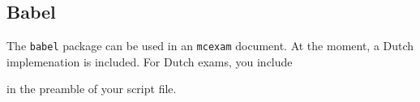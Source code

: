\documentclass{article}
\begin{document}
  
\subsection{Babel}  

The \verb$babel$ package can be used in an \verb$mcexam$ document. At the moment, a Dutch implemenation is included. For Dutch exams, you include
\begin{code}
\usepackage[dutch]{babel}
\end{code}
in the preamble of your script file.






 
 
 
\end{document}

